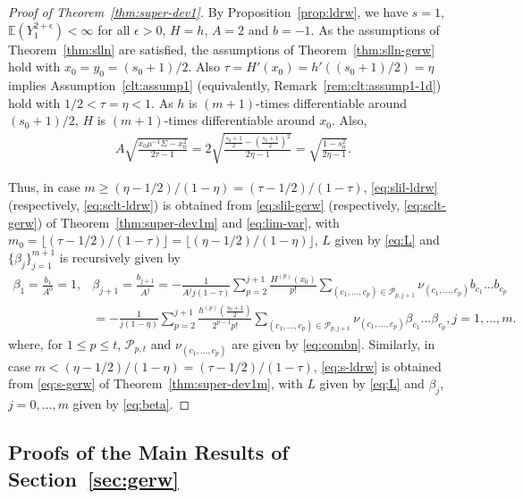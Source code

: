 \documentclass[12pt]{amsart}
\theoremstyle{plain}
\theoremstyle{remark}
\numberwithin{equation}{section}
\begin{document}
\begin{proof}[Proof of Theorem~\ref{thm:super-dev1}] 
By Proposition~\ref{prop:ldrw}, we have $s=1$, $\mathbb{E}\left({Y}_1^{2+\epsilon}\right) < \infty$ for all $\epsilon > 0$, ${H} = h$, $A = 2$ and $b = -1$. 
As the assumptions of Theorem~\ref{thm:slln} are satisfied, %
the assumptions of Theorem~\ref{thm:slln-gerw} hold with $x_0 = y_0 = (s_0+1)/2$. 
Also $\tau = H'(x_0) = h'((s_0+1)/2) = \eta$ implies Assumption~\ref{clt:assump1} (equivalently, Remark~\ref{rem:clt:assump1-1d}) hold with $1/2 < \tau = \eta < 1$. As $h$ is $(m+1)$-times differentiable around $(s_0+1)/2$, $H$ is $(m+1)$-times differentiable around $x_0$. Also, \begin{align}\label{eq:lim-var}A\sqrt{\frac{x_0\mu^{-1}{\Sigma}-x^2_0}{2\tau-1}} = 2\sqrt{\frac{\frac{s_0+1}{2} -  \left(\frac{s_0+1}{2}\right)^2}{2\eta-1}} = \sqrt{\frac{1-s^2_0}{2\eta-1}}.\end{align} 

Thus, in case $m \geq (\eta - 1/2)/(1-\eta) = (\tau - 1/2)/(1-\tau)$, \eqref{eq:slil-ldrw} (respectively, \eqref{eq:sclt-ldrw}) is obtained from \eqref{eq:slil-gerw} (respectively, \eqref{eq:sclt-gerw}) of Theorem~\ref{thm:super-dev1m} and \eqref{eq:lim-var}, with $m_0 = \lfloor(\tau - 1/2)/(1-\tau)\rfloor = \lfloor(\eta - 1/2)/(1-\eta)\rfloor$, $L$ given by \eqref{eq:L} and $\{\beta_j\}_{j=1}^{m+1}$ is recursively given by \begin{align}\label{eq:beta}\beta_1 = \frac{b_1}{A^0} = 1, &\beta_{j+1} = \frac{b_{j+1}}{A^j} =-\frac{1}{A^jj(1-\tau)}\sum_{p=2}^{j+1}\frac{H^{(p)}(x_0)}{p!}\sum_{(c_1, \ldots, c_p) \in \mathcal{P}_{p,j+1}}\nu_{(c_1, \ldots, c_p)}b_{c_1}\ldots b_{c_p} \\&= -\frac{1}{j(1-\eta)}\sum_{p=2}^{j+1}\frac{h^{(p)}\left(\frac{s_0+1}{2}\right)}{2^{p-1}p!}\sum_{(c_1, \ldots, c_p) \in \mathcal{P}_{p,j+1}}\nu_{(c_1, \ldots, c_p)}\beta_{c_1}\ldots \beta_{c_p}, j = 1, \ldots, m.\nonumber\end{align} 
where, for $1 \leq p \leq t$, $\mathcal{P}_{p,t}$ and $\nu_{(c_1, \ldots, c_p)}$ are given by \eqref{eq:combn}.
Similarly, in case $m < (\eta - 1/2)/(1-\eta) = (\tau - 1/2)/(1-\tau)$, \eqref{eq:s-ldrw} is obtained from \eqref{eq:s-gerw} of Theorem~\ref{thm:super-dev1m}, with $L$ given by \eqref{eq:L} and $\beta_j$, $j = 0, \ldots, m$ given by \eqref{eq:beta}. 
\end{proof}

\subsection{Proofs of the Main Results of Section~\ref{sec:gerw}}\label{sec:proofs-gerw}
\end{document}
